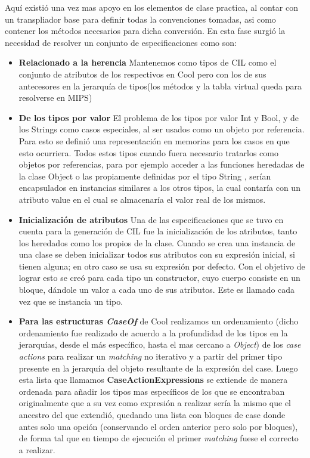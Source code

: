 \documentclass[a4paper,10pt,twocolumn]{article}
\begin{document}
  Aquí existió una vez mas apoyo en los elementos de clase practica, al contar con un transpliador base para definir todas la convenciones tomadas, asi como contener los métodos necesarios para dicha conversión.
 En esta fase surgió la necesidad de resolver  un conjunto de especificaciones como son: 
	\begin{itemize}
		\item \textbf{Relacionado a la herencia} Mantenemos como tipos de CIL como el conjunto de atributos de los respectivos en Cool pero con los de sus antecesores en la jerarqu\'ia de tipos(los m\'etodos y la tabla virtual queda para resolverse en MIPS)
		\item \textbf{De los tipos por valor} El problema de los tipos por valor  Int y	Bool, y de los  Strings como casos especiales, al ser usados como un objeto por referencia. Para esto se definió una representación en memorias para los casos en
		que esto ocurriera. Todos estos tipos cuando fuera necesario tratarlos como objetos
		por referencias, para por ejemplo acceder a las funciones heredadas de la clase
		Object o las propiamente definidas por el tipo String , serían encapsulados en
		instancias similares a los otros tipos, la cual contaría con un atributo value en el cual
		se almacenaría el valor real de los mismos.
		\item \textbf{Inicializaci\'on de atributos} Una de las especificaciones que se tuvo en cuenta para la generación de CIL fue la inicialización
		de los atributos, tanto los heredados como los propios de la clase. Cuando se crea una instancia
		de una clase se deben inicializar todos sus atributos con su expresión inicial, si tienen alguna;
		en otro caso se usa su expresión por defecto. Con el objetivo de lograr esto se creó para cada
		tipo un constructor, cuyo cuerpo consiste en un bloque, dándole un valor a cada uno de sus
		atributos. Este es llamado cada vez que se instancia un tipo.
		\item \textbf{Para las estructuras \textit{CaseOf}} de Cool realizamos un ordenamiento (dicho ordenamiento fue realizado de acuerdo a la profundidad de los tipos en la jerarqu\'ias, desde el m\'as espec\'ifico, hasta el mas cercano a \textit{Object}) de los \textit{case actions} para realizar un \textit{matching} no iterativo y a partir del primer tipo presente en la jerarqu\'ia del objeto resultante de la expresi\'on del case.
		Luego esta lista que llamamos \textbf{CaseActionExpressions} se extiende de manera ordenada para a\~nadir los tipos mas espec\'ificos de los que se encontraban originalmente que a su vez como expresi\'on a realizar ser\'ia la mismo que el ancestro del que extendió, quedando una lista con bloques de case donde antes solo una opci\'on (conservando el orden anterior pero solo por bloques), de forma tal que en tiempo de ejecuci\'on el primer \textit{matching} fuese el correcto a realizar.
	\end{itemize}
\end{document}
